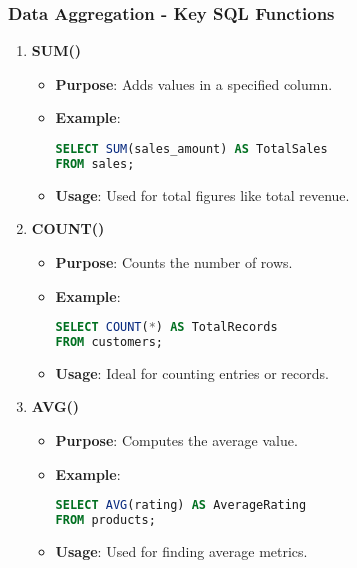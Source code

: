 \documentclass[aspectratio=169]{beamer}
\begin{document}
\begin{frame}[fragile]
    \frametitle{Data Aggregation - Key SQL Functions}
    \begin{enumerate}
        \item \textbf{SUM()}
        \begin{itemize}
            \item \textbf{Purpose}: Adds values in a specified column.
            \item \textbf{Example}:
            \begin{lstlisting}[language=SQL]
SELECT SUM(sales_amount) AS TotalSales 
FROM sales;
            \end{lstlisting}
            \item \textbf{Usage}: Used for total figures like total revenue.
        \end{itemize}
        
        \item \textbf{COUNT()}
        \begin{itemize}
            \item \textbf{Purpose}: Counts the number of rows.
            \item \textbf{Example}:
            \begin{lstlisting}[language=SQL]
SELECT COUNT(*) AS TotalRecords 
FROM customers;
            \end{lstlisting}
            \item \textbf{Usage}: Ideal for counting entries or records.
        \end{itemize}
        
        \item \textbf{AVG()}
        \begin{itemize}
            \item \textbf{Purpose}: Computes the average value.
            \item \textbf{Example}:
            \begin{lstlisting}[language=SQL]
SELECT AVG(rating) AS AverageRating 
FROM products;
            \end{lstlisting}
            \item \textbf{Usage}: Used for finding average metrics.
        \end{itemize}
    \end{enumerate}
\end{frame}
\end{document}
